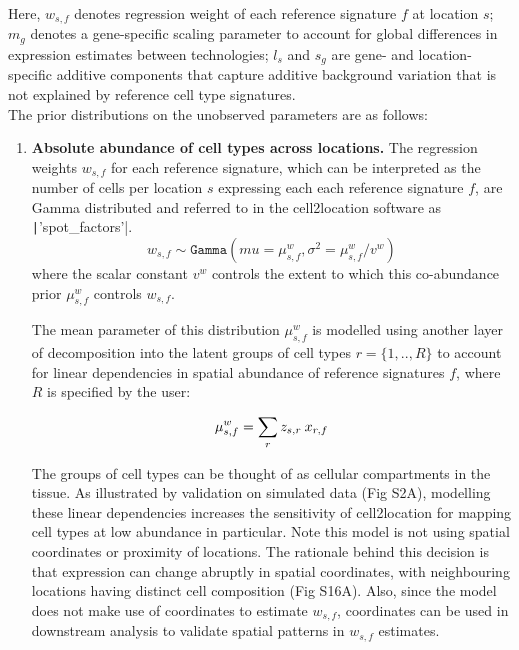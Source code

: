 \documentclass[11pt,a4paper]{article}
\begin{document}
Here, $w_{s,f}$ denotes regression weight of each reference signature $f$ at location $s$; 
$m_{g}$ denotes a gene-specific scaling parameter to account for global differences in expression estimates between technologies;
$l_{s}$ and $s_{g}$ are gene- and location-specific additive components that capture additive background variation that is not explained by reference cell type signatures. \\

The prior distributions on the unobserved parameters are as follows:
\begin{enumerate}
    \item \textbf{Absolute abundance of cell types across locations.}
    The regression weights $w_{s,f}$ for each reference signature, which can be interpreted as the number of cells per location $s$ expressing each each reference signature $f$, are Gamma distributed and referred to in the cell2location software as \texttt|'spot_factors'|. \newline
    \begin{equation} \label{eq:c2l:4}
    w_{s,f} \sim \mathtt{Gamma}(mu = {\mu}^{w}_{s,f}, \sigma^2 = {\mu}^{w}_{s,f} / v^{w})
    \end{equation}
    where the scalar constant $v^{w}$ controls the extent to which this co-abundance prior $\mu^{w}_{s,f}$ controls $w_{s,f}$.
    
    The mean parameter of this distribution ${\mu}^{w}_{s,f}$ is modelled using another layer of decomposition into the latent groups of cell types $r=\{1,..,R\}$ to account for linear dependencies in spatial abundance of reference signatures $f$, where $R$ is specified by the user:
    
    \begin{equation} \label{eq:c2l:5}
    {\mu}^{w}_{s,f} = \sum_{r} {z_{s,r} \: x_{r,f}}\\
    \end{equation}
    
    The groups of cell types can be thought of as cellular compartments in the tissue. As illustrated by validation on simulated data (Fig S2A), modelling these linear dependencies increases the sensitivity of cell2location for mapping cell types at low abundance in particular. Note this model is not using spatial coordinates or proximity of locations. The rationale behind this decision is that expression can change abruptly in spatial coordinates, with neighbouring locations having distinct cell composition (Fig S16A). Also, since the model does not make use of coordinates to estimate $w_{s,f}$, coordinates can be used in downstream analysis to validate spatial patterns in $w_{s,f}$ estimates.
    

\end{enumerate}
\end{document}
